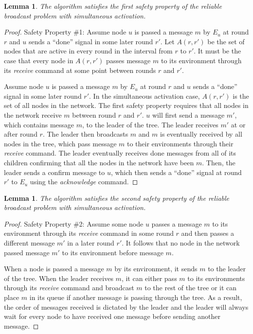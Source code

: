 \documentclass[english]{article}
\newtheorem{lemma}[theorem]{Lemma}
\begin{document}
\begin{lemma}
\label{StaticRBSafety1}
The algorithm satisfies the first safety property of the reliable broadcast problem with simultaneous activation.
\end{lemma}
\begin{proof}
Safety Property \#1: Assume node $u$ is passed a message $m$ by $E_u$ at round $r$ and $u$ sends  a ``done'' signal in some later round $r'$. Let $A(r,r')$ be the set of nodes that are active in every round in the interval from $r$ to $r'$. It must be the case that every node in $A(r,r')$ passes message $m$ to its environment through its \textit{receive} command at some point between rounds $r$ and $r'$. 

Assume node $u$ is passed a message $m$ by $E_u$ at round $r$ and $u$ sends  a ``done'' signal in some later round $r'$.
In the simultaneous activation case, $A(r,r')$ is the set of all nodes in the network. The first safety property requires that all nodes in the network receive $m$ between round $r$ and $r'$. $u$ will first send a message $m'$, which contains message $m$, to the leader of the tree. The leader receives $m'$ at or after round $r$. The leader then broadcasts $m$ and $m$ is eventually received by all nodes in the tree, which pass message $m$ to their environments through their \textit{receive} command. The leader eventually receives done messages from all of its children confirming that all the nodes in the network have been $m$. Then, the leader sends a confirm message to $u$, which then sends  a ``done'' signal at round $r'$ to $E_u$ using the \textit{acknowledge} command. 

\end{proof}

\begin{lemma}
\label{StaticRBSafety2}
The algorithm satisfies the second safety property of the reliable broadcast problem with simultaneous activation.
\end{lemma}
\begin{proof}
Safety Property \#2: Assume some node $u$ passes a message $m$ to its environment through its \textit{receive} command in some round $r$ and then passes a different message $m'$ in a later round $r'$. It follows that no node in the network passed message $m'$ to its environment before message $m$. 

When a node is passed a message $m$ by its environment, it sends $m$ to the leader of the tree. When the leader receives $m$, it can either pass $m$ to its environments through its \textit{receive} command and broadcast $m$ to the rest of the tree or it can place $m$ in its queue if another message is passing through the tree. As a result, the order of messages received is dictated by the leader and the leader will always wait for every node to have received one message before sending another message. 
\end{proof}
\end{document}
